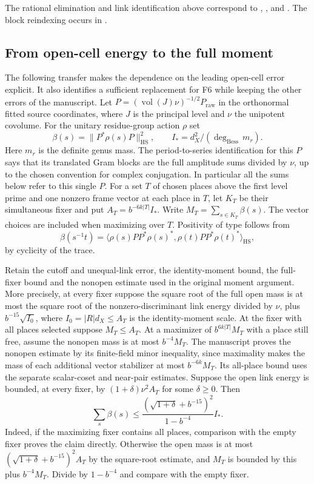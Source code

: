 The rational elimination and link identification above correspond to
,
, and
.
The block reindexing occurs in
.

\subsection{From open-cell energy to the full moment}\label{moment:full}

The following transfer makes the dependence on the leading open-cell
error explicit. It also identifies a sufficient replacement for F6
while keeping the other errors of the manuscript. Let
$P=(\operatorname{vol}(J)\nu)^{-1/2}P_{\mathrm{raw}}$ in the
orthonormal fitted source coordinates, where $J$ is the principal
level and $\nu$ the unipotent covolume. For the unitary residue-group
action $\rho$ set
\[
 \beta(s)=\|P^*\rho(s)P\|_{\mathrm{HS}}^2,\qquad
 I_*=d_X^2/(\deg_{\mathrm{Bess}}\,m_r).
\]
Here $m_r$ is the definite genus mass. The period-to-series
identification for this $P$ says that its translated Gram blocks are
the full amplitude sums divided by $\nu$, up to the chosen convention
for complex conjugation. In particular all the sums below refer to this
single $P$. For a set $T$ of chosen places above the first level prime
and one nonzero frame vector at each place in $T$, let $K_T$ be their
simultaneous fixer and put $A_T=b^{-6k|T|}I_*$. Write
$M_T=\sum_{s\in K_T}\beta(s)$. The vector choices are included when
maximizing over $T$. Positivity of type follows from
\[
  \beta(s^{-1}t)=\langle \rho(s)PP^*\rho(s)^*,\rho(t)PP^*\rho(t)^*
                    \rangle_{\mathrm{HS}},
\]
by cyclicity of the trace.

Retain the cutoff and unequal-link error, the identity-moment bound,
the full-fixer bound and the nonopen estimate used in the original
moment argument. More precisely, at every fixer suppose the
square root of the full open mass is at most the square root of the
nonzero-discriminant link energy divided by $\nu$, plus
$b^{-15}\sqrt{I_0}$, where $I_0=|R|d_X\le A_T$ is the identity-moment scale. At the fixer with all places selected suppose $M_T\le A_T$.
At a maximizer of $b^{6k|T|}M_T$ with a place still free, assume the
nonopen mass is at most $b^{-4}M_T$. The manuscript proves the nonopen estimate by its finite-field minor
inequality, since maximality makes the mass of each additional vector
stabilizer at most $b^{-6k}M_T$. Its all-place bound uses the separate
scalar-coset and near-pair estimates. Suppose the open link energy is bounded, at every
fixer, by $(1+\delta)\nu^2 A_T$ for some $\delta\ge0$. Then
\[
    \sum_s\beta(s)\le
    \frac{(\sqrt{1+\delta}+b^{-15})^2}{1-b^{-4}} I_*.
\]
Indeed, if the maximizing fixer contains all places, comparison
with the empty fixer proves the claim directly. Otherwise the open
mass is at most $(\sqrt{1+\delta}+b^{-15})^2 A_T$ by the square-root
estimate, and $M_T$ is bounded by this plus $b^{-4}M_T$.
Divide by $1-b^{-4}$ and compare with the empty fixer.

